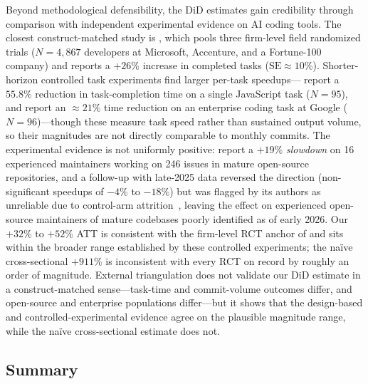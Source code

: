 Beyond methodological defensibility, the DiD estimates gain credibility through comparison with independent experimental evidence on AI coding tools.
The closest construct-matched study is \citet{cui2025effects}, which pools three firm-level field randomized trials ($N = 4{,}867$ developers at Microsoft, Accenture, and a Fortune-100 company) and reports a $+26\%$ increase in completed tasks ($\text{SE} \approx 10\%$).
Shorter-horizon controlled task experiments find larger per-task speedups---\citet{peng2023impact} report a $55.8\%$ reduction in task-completion time on a single JavaScript task ($N = 95$), and \citet{DBLP:conf/icse-seip/ParadisGMNMMZFC25} report an $\approx 21\%$ time reduction on an enterprise coding task at Google ($N = 96$)---though these measure task speed rather than sustained output volume, so their magnitudes are not directly comparable to monthly commits.
The experimental evidence is not uniformly positive: \citet{becker2025measuring} report a $+19\%$ \emph{slowdown} on 16 experienced maintainers working on 246 issues in mature open-source repositories, and a follow-up with late-2025 data reversed the direction (non-significant speedups of $-4\%$ to $-18\%$) but was flagged by its authors as unreliable due to control-arm attrition~\cite{metr2026uplift}, leaving the effect on experienced open-source maintainers of mature codebases poorly identified as of early 2026.
Our $+32\%$ to $+52\%$ ATT is consistent with the firm-level RCT anchor of \citet{cui2025effects} and sits within the broader range established by these controlled experiments; the na\"ive cross-sectional $+911\%$ is inconsistent with every RCT on record by roughly an order of magnitude.
External triangulation does not validate our DiD estimate in a construct-matched sense---task-time and commit-volume outcomes differ, and open-source and enterprise populations differ---but it shows that the design-based and controlled-experimental evidence agree on the plausible magnitude range, while the na\"ive cross-sectional estimate does not.

\subsection{Summary}
\label{sec:summary}

